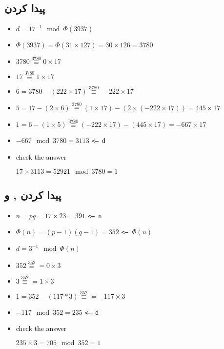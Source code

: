 \documentclass{article}
\begin{document}
\subsection{پیدا کردن }
\begin{latin}
\begin{itemize}
\item[] $d = 17^{-1} \mod \Phi(3937)$
\item[] $\Phi(3937) = \Phi(31\times127) = 30\times126 = 3780$
\item[] $3780 \overset{3780}{\equiv} 0 \times 17$
\item[] $17 \overset{3780}{\equiv} 1 \times 17$
\item[] $6  = 3780 - (222\times17) \overset{3780}{\equiv} -222 \times 17$
\item[] $5  = 17 - (2\times6) \overset{3780}{\equiv}
(1\times17) - (2\times(-222\times17)) = 445\times17$
\item[] $1  = 6 - (1\times5) \overset{3780}{\equiv}
(-222\times17) - (445\times17)  = -667 \times 17$
\item[] $-667 \mod 3780 = 3113$  \texttt{<-- d}
\item[] check the answer

$17 \times 3113 = 52921 \mod 3780 = 1$
\end{itemize}
\end{latin}

\subsection{پیدا کردن ,  و }
\begin{latin}
\begin{itemize}
\item[] $n = pq = 17\times23 = 391$ \texttt{<-- n}
\item[] $\Phi(n) = (p-1)(q-1) = 352$ \texttt{<-- $\Phi(n)$}
\item[] $d = 3^{-1} \mod \Phi(n)$
\item[] $352 \overset{352}{\equiv} = 0\times3$
\item[] $3 \overset{352}{\equiv} = 1\times3$
\item[] $1 = 352 - (117*3) \overset{352}{\equiv} =
-117 \times 3$
\item[] $-117 \mod 352 = 235$ \texttt{<-- d}

\item[] check the answer

$235\times3 = 705 \mod 352 = 1$
\end{itemize}
\end{latin}
\end{document}
